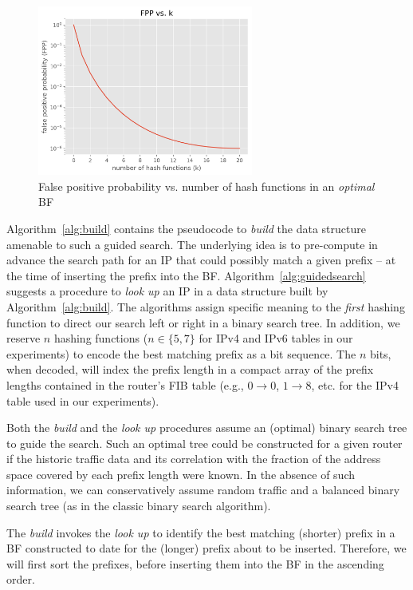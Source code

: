 \documentclass[conference,compsoc]{IEEEtran}
\begin{document}
\begin{figure}[h]
\centering
\includegraphics[height=2.2in]{../img/PvsK.png}
  \caption{False positive probability vs. number of hash functions in an \emph{optimal} BF}
\label{fig:fpp}
\end{figure}


Algorithm~\ref{alg:build} contains the pseudocode to \emph{build} the data 
structure amenable to such a guided search. The underlying idea is to
pre-compute in advance the search path for an IP that could possibly match a given
prefix -- at the time of inserting the prefix into the BF.
Algorithm~\ref{alg:guidedsearch} suggests
a procedure to \emph{look up} an IP in a data structure built by
Algorithm~\ref{alg:build}. The
algorithms assign specific meaning to the \emph{first} hashing function
to direct our search left or right in a binary search tree. In addition, we
reserve $n$ hashing functions ($n\in\{5,7\}$ for IPv4 and IPv6 tables
in our experiments) to encode
the best matching prefix as a bit sequence. The $n$ bits, when decoded,
will index the prefix length in a compact array of the prefix lengths
contained in the router's FIB table (e.g., $0 \rightarrow 0$, $1 \rightarrow 8$, etc.
for the IPv4 table used in our experiments).

Both the \emph{build} and the \emph{look up} procedures assume an (optimal)
binary search tree to guide the search. Such an optimal tree could be
constructed for a given router if the historic traffic data and its 
correlation with the fraction of the address space covered by each prefix length
were known. In the absence of such information, we can conservatively
assume random traffic and a balanced binary search tree (as in the
classic binary search algorithm).

The \emph{build} invokes the \emph{look up} to identify the
best matching (shorter) prefix in a BF constructed to date for the 
(longer) prefix
about to be inserted. Therefore, we will first sort the prefixes, before
inserting them into the BF in the ascending order.
\end{document}
